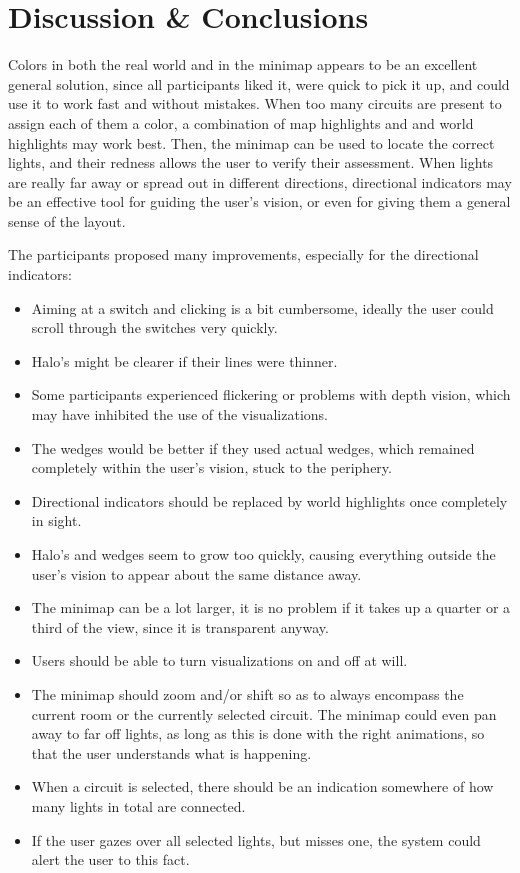 \section{Discussion \& Conclusions} \label{sec:user:disc_conc}
Colors in both the real world and in the minimap appears to be an excellent general solution, since all participants liked it, were quick to pick it up, and could use it to work fast and without mistakes. When too many circuits are present to assign each of them a color, a combination of map highlights and and world highlights may work best. Then, the minimap can be used to locate the correct lights, and their redness allows the user to verify their assessment. When lights are really far away or spread out in different directions, directional indicators may be an effective tool for guiding the user's vision, or even for giving them a general sense of the layout.

The participants proposed many improvements, especially for the directional indicators:
\begin{itemize}
  \item Aiming at a switch and clicking is a bit cumbersome, ideally the user could scroll through the switches very quickly.
  \item Halo's might be clearer if their lines were thinner.
  \item Some participants experienced flickering or problems with depth vision, which may have inhibited the use of the visualizations.
  \item The wedges would be better if they used actual wedges, which remained completely within the user's vision, stuck to the periphery.
  \item Directional indicators should be replaced by world highlights once completely in sight.
  \item Halo's and wedges seem to grow too quickly, causing everything outside the user's vision to appear about the same distance away.
  \item The minimap can be a lot larger, it is no problem if it takes up a quarter or a third of the view, since it is transparent anyway.
  \item Users should be able to turn visualizations on and off at will.
  \item The minimap should zoom and/or shift so as to always encompass the current room or the currently selected circuit. The minimap could even pan away to far off lights, as long as this is done with the right animations, so that the user understands what is happening.
  \item When a circuit is selected, there should be an indication somewhere of how many lights in total are connected.
  \item If the user gazes over all selected lights, but misses one, the system could alert the user to this fact.
\end{itemize}

